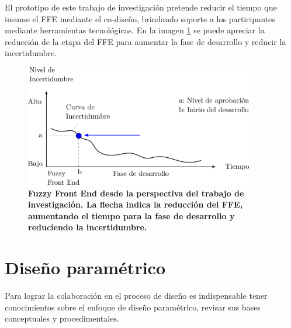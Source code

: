 El prototipo de este trabajo de investigación pretende reducir el tiempo que insume el FFE mediante el co-diseño, brindando soporte a los participantes mediante herramientas tecnológicas. En la imagen \ref{fig:fuzzy2} se puede apreciar la reducción de la etapa del FFE para aumentar la fase de desarrollo y reducir la incertidumbre. 


\begin{figure}
\centering
\includegraphics[width=10cm]{Img/CPD/fuzzy1.png}
\caption{\textbf{\footnotesize{Fuzzy Front End desde la perspectiva del trabajo de investigación. La flecha indica la reducción del FFE, aumentando el tiempo para la fase de desarrollo y reduciendo la incertidumbre.}}}
\label{fig:fuzzy2}
\end{figure}



\clearpage
\section{Diseño paramétrico} 
\label{disenoparam}
Para lograr la colaboración en el proceso de diseño es indispensable tener conocimientos sobre el enfoque de diseño paramétrico, revisar sus bases conceptuales y procedimentales.

